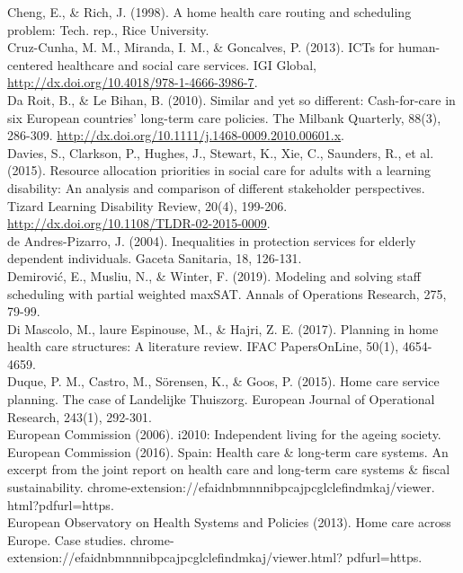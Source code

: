 \documentclass[10pt]{article}
\begin{document}
Cheng, E., \& Rich, J. (1998). A home health care routing and scheduling problem: Tech. rep., Rice University.\\
Cruz-Cunha, M. M., Miranda, I. M., \& Goncalves, P. (2013). ICTs for human-centered healthcare and social care services. IGI Global, \href{http://dx.doi.org/10.4018/978-1-4666-3986-7}{http://dx.doi.org/10.4018/978-1-4666-3986-7}.\\
Da Roit, B., \& Le Bihan, B. (2010). Similar and yet so different: Cash-for-care in six European countries' long-term care policies. The Milbank Quarterly, 88(3), 286-309. \href{http://dx.doi.org/10.1111/j.1468-0009.2010.00601.x}{http://dx.doi.org/10.1111/j.1468-0009.2010.00601.x}.\\
Davies, S., Clarkson, P., Hughes, J., Stewart, K., Xie, C., Saunders, R., et al. (2015). Resource allocation priorities in social care for adults with a learning disability: An analysis and comparison of different stakeholder perspectives. Tizard Learning Disability Review, 20(4), 199-206. \href{http://dx.doi.org/10.1108/TLDR-02-2015-0009}{http://dx.doi.org/10.1108/TLDR-02-2015-0009}.\\
de Andres-Pizarro, J. (2004). Inequalities in protection services for elderly dependent individuals. Gaceta Sanitaria, 18, 126-131.\\
Demirović, E., Musliu, N., \& Winter, F. (2019). Modeling and solving staff scheduling with partial weighted maxSAT. Annals of Operations Research, 275, 79-99.\\
Di Mascolo, M., laure Espinouse, M., \& Hajri, Z. E. (2017). Planning in home health care structures: A literature review. IFAC PapersOnLine, 50(1), 4654-4659.\\
Duque, P. M., Castro, M., Sörensen, K., \& Goos, P. (2015). Home care service planning. The case of Landelijke Thuiszorg. European Journal of Operational Research, 243(1), 292-301.\\
European Commission (2006). i2010: Independent living for the ageing society.\\
European Commission (2016). Spain: Health care \& long-term care systems. An excerpt from the joint report on health care and long-term care systems \& fiscal sustainability. chrome-extension://efaidnbmnnnibpcajpcglclefindmkaj/viewer. html?pdfurl=https.\\
European Observatory on Health Systems and Policies (2013). Home care across Europe. Case studies. chrome-extension://efaidnbmnnnibpcajpcglclefindmkaj/viewer.html? pdfurl=https.\\
\end{document}
